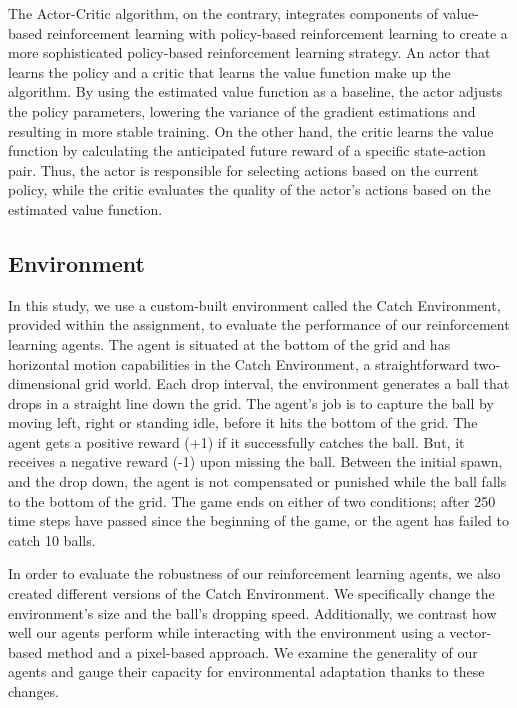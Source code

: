 \documentclass{article}
\begin{document}
The Actor-Critic algorithm, on the contrary, integrates components of value-based reinforcement learning with policy-based reinforcement learning to create a more sophisticated policy-based reinforcement learning strategy.
An actor that learns the policy and a critic that learns the value function make up the algorithm.
By using the estimated value function as a baseline, the actor adjusts the policy parameters, lowering the variance of the gradient estimations and resulting in more stable training.
On the other hand, the critic learns the value function by calculating the anticipated future reward of a specific state-action pair.
Thus, the actor is responsible for selecting actions based on the current policy, while the critic evaluates the quality of the actor's actions based on the estimated value function.

\subsection{Environment}
\label{I-Environment}
In this study, we use a custom-built environment called the Catch Environment, provided within the assignment, to evaluate the performance of our reinforcement learning agents.
The agent is situated at the bottom of the grid and has horizontal motion capabilities in the Catch Environment, a straightforward two-dimensional grid world.
Each drop interval, the environment generates a ball that drops in a straight line down the grid. 
The agent's job is to capture the ball by moving left, right or standing idle, before it hits the bottom of the grid. 
The agent gets a positive reward (+1) if it successfully catches the ball.
But, it receives a negative reward (-1) upon missing the ball. 
Between the initial spawn, and the drop down, the agent is not compensated or punished while the ball falls to the bottom of the grid.
The game ends on either of two conditions; after 250 time steps have passed since the beginning of the game,  or the agent has failed to catch 10 balls.

In order to evaluate the robustness of our reinforcement learning agents, we also created different versions of the Catch Environment.
We specifically change the environment's size and the ball's dropping speed.
Additionally, we contrast how well our agents perform while interacting with the environment using a vector-based method and a pixel-based approach.
We  examine the generality of our agents and gauge their capacity for environmental adaptation thanks to these changes.
\end{document}
